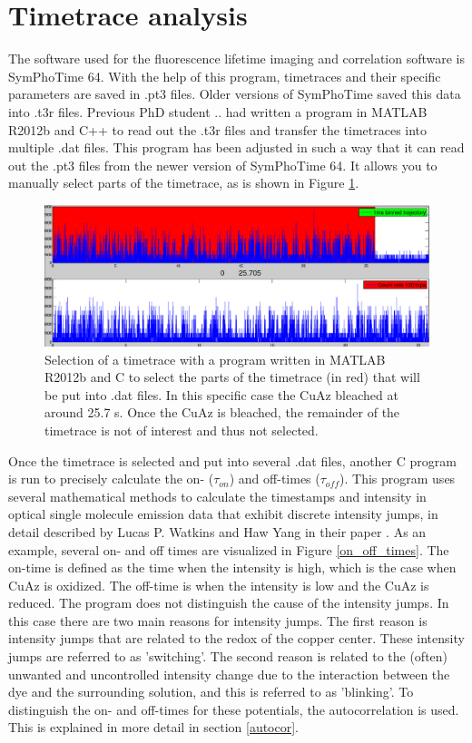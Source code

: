 \documentclass[twoside,single]{lion-msc}
\begin{document}
\section*{Timetrace analysis}
The software used for the fluorescence lifetime imaging and correlation software is SymPhoTime 64. With the help of this program, timetraces and their specific parameters are saved in .pt3 files. Older versions of SymPhoTime saved this data into .t3r files. Previous PhD student .. had written a program in MATLAB R2012b and C++ to read out the .t3r files and transfer the timetraces into multiple .dat files. This program has been adjusted in such a way that it can read out the .pt3 files from the newer version of SymPhoTime 64. It allows you to manually select parts of the timetrace, as is shown in Figure \ref{timetrace_selection}.

\begin{figure}[ht!]
\centering
\includegraphics[width=\textwidth]{timetrace_selection}
\caption{Selection of a timetrace with a program written in MATLAB R2012b and C to select the parts of the timetrace (in red) that will be put into .dat files. In this specific case the CuAz bleached at around 25.7 s. Once the CuAz is bleached, the remainder of the timetrace is not of interest and thus not selected.}
\label{timetrace_selection}
\end{figure}

Once the timetrace is selected and put into several .dat files, another C program is run to precisely calculate the  on- ($\tau_{on}$) and off-times ($\tau_{off}$). This program uses several mathematical methods to calculate the timestamps and intensity in optical single molecule emission data that exhibit discrete intensity jumps, in detail described by Lucas P. Watkins and Haw Yang in their paper \cite{And2004}. As an example, several on- and off times are visualized in Figure \ref{on_off_times}. The on-time is defined as the time when the intensity is high, which is the case when CuAz is oxidized. The off-time is when the intensity is low and the CuAz is reduced. The program does not distinguish the cause of the intensity jumps. In this case there are two main reasons for intensity jumps. The first reason is intensity jumps that are related to the redox of the copper center. These intensity jumps are referred to as 'switching'. The second reason is related to the (often) unwanted and uncontrolled intensity change due to the interaction between the dye and the surrounding solution, and this is referred to as 'blinking'. To distinguish the on- and off-times for these potentials, the autocorrelation is used. This is explained in more detail in section \ref{autocor}.
\end{document}
